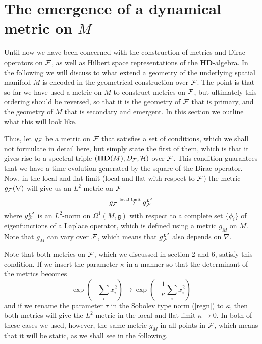\documentclass[letterpaper,12pt]{article}
\def\OO{\Omega}
\def\cf{{\cal F}}
\def\ch{{\cal H}}
\begin{document}
\section{The emergence of a dynamical metric on $M$}


Until now we have been concerned with the construction of metrics and Dirac operators on $\cf$, as well as Hilbert space representations of the $\mathbf{HD}$-algebra. In the following we will discuss to what extend a geometry of the underlying spatial manifold $M$ is encoded in the geometrical construction over $\cf$. The point is that so far we have used a metric on $M$ to construct metrics on $\cf$, but ultimately this ordering should be reversed, so that it is the geometry of $\cf$ that is primary, and the geometry of $M$ that is secondary and emergent. In this section we outline what this will look like.



Thus, let
$g_{\cf}$ be a metric on $\cf$ that satisfies a set of conditions, which we shall not formulate in detail here, but simply state the first of them, which is that it gives rise to a spectral triple $(\mathbf{HD}(M),D_\cf,\ch)$ over $\cf$. This condition guarantees that we have a time-evolution generated by the square of the Dirac operator. 
Now, in the local and flat limit (local and flat with respect to $\cf$) the metric $g_{\cf}(\nabla )$ will give us an $L^2$-metric on $\cf$
$$
 g_{\cf} \stackrel{\mbox{\tiny local limit}}{\longrightarrow}  g_{\cf}^{\mbox{\tiny$L^2$}}
$$
 where $g_{\cf}^{\mbox{\tiny$L^2$}}$ is an $L^2$-norm on $\OO^1(M,\mathfrak{g})$ with respect to a complete set $\{\phi_i\}$ of eigenfunctions of a Laplace operator, which is defined using a metric $g_M$ on $M$. Note that $g_M$ can vary over $\cf$, which means that $g_{\cf}^{\mbox{\tiny$L^2$}}$ also depends on $\nabla$.  

Note that both metrics on $\cf$, which we discussed in section 2 and 6, satisfy this condition. If we insert the parameter $\kappa$ in a manner so that the determinant of the metrics becomes
$$
\exp(-\sum_i x_i^2)\rightarrow \exp(-\frac{1}{\kappa}\sum_i x_i^2)
$$
and if we rename the parameter $\tau$ in the Sobolev type norm (\ref{regn}) to $\kappa$, 
then both metrics will give the $L^2$-metric in the local and flat limit $\kappa\rightarrow 0$. In both of these cases we used, however, the same metric $g_M$ in all points in $\cf$, which means that it will be static, as we shall see in the following. 
\end{document}
